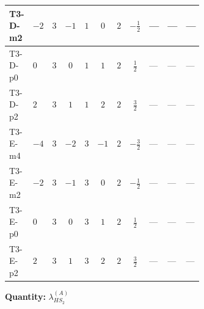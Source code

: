 \documentclass[8pt]{article}
\begin{document}
\begin{landscape}
\begin{longtable}{@{}llcccccc >{\raggedright\arraybackslash}p{0.21\linewidth} >{\raggedright\arraybackslash}p{0.21\linewidth} >{\raggedright\arraybackslash}p{0.21\linewidth}@{}}
\midrule
T3-D-m2 & $-2$ & $3$ & $-1$ & $1$ & $0$ & $2$ & $-\frac{1}{2}$ & --- & --- & --- \\
\midrule
T3-D-p0 & $0$ & $3$ & $0$ & $1$ & $1$ & $2$ & $\frac{1}{2}$ & --- & --- & --- \\
\midrule
T3-D-p2 & $2$ & $3$ & $1$ & $1$ & $2$ & $2$ & $\frac{3}{2}$ & --- & --- & --- \\
\midrule
T3-E-m4 & $-4$ & $3$ & $-2$ & $3$ & $-1$ & $2$ & $-\frac{3}{2}$ & --- & --- & --- \\
\midrule
T3-E-m2 & $-2$ & $3$ & $-1$ & $3$ & $0$ & $2$ & $-\frac{1}{2}$ & --- & --- & --- \\
\midrule
T3-E-p0 & $0$ & $3$ & $0$ & $3$ & $1$ & $2$ & $\frac{1}{2}$ & --- & --- & --- \\
\midrule
T3-E-p2 & $2$ & $3$ & $1$ & $3$ & $2$ & $2$ & $\frac{3}{2}$ & --- & --- & --- \\
\midrule
\bottomrule
\end{longtable}
\clearpage
\noindent\textbf{Quantity: }$\lambda_{HS_2}^{(A)}$\par\smallskip

\end{landscape}
\end{document}
